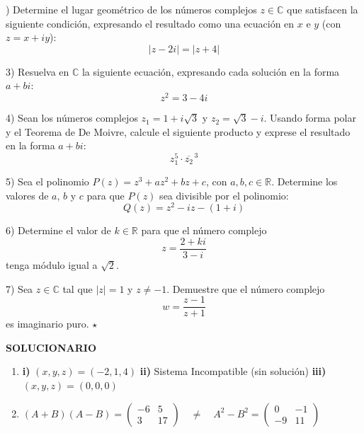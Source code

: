 \documentclass[letterpaper, 12pt]{article}
\newenvironment{solbox}[1]{%
    \begin{tcolorbox}[colback=celesteSuave, colframe=azulFuerte,
        title=\textbf{#1}, fonttitle=\bfseries]
}{%
    \end{tcolorbox}
}
\newenvironment{ejercicios}{}{}
\newenvironment{soluciones}{%
    \newpage
    \begin{center}
        \begin{tcolorbox}[colback=azulFuerte, colframe=azulFuerte,
            colupper=white, width=0.8\textwidth, center, arc=10pt]
            \centering\Large\textbf{SOLUCIONARIO}
        \end{tcolorbox}
    \end{center}
    \footnotesize
}{}
\begin{document}
\begin{ejercicios}
2) Determine el lugar geométrico de los números complejos $z \in \mathbb{C}$ que satisfacen la siguiente condición, expresando el resultado como una ecuación en $x$ e $y$ (con $z = x+iy$):
$$ |z - 2i| = |z + 4| $$
 
\vspace{0.5cm}
 
3) Resuelva en $\mathbb{C}$ la siguiente ecuación, expresando cada solución en la forma $a+bi$:
$$ z^2 = 3 - 4i $$
 
\vspace{0.5cm}
 
4) Sean los números complejos $z_1 = 1 + i\sqrt{3}$ y $z_2 = \sqrt{3} - i$. Usando forma polar y el Teorema de De Moivre, calcule el siguiente producto y exprese el resultado en la forma $a+bi$:
$$ z_1^5 \cdot \overline{z_2}^{\,3} $$
 
\vspace{0.5cm}
 
5) Sea el polinomio $P(z) = z^3 + az^2 + bz + c$, con $a, b, c \in \mathbb{R}$. Determine los valores de $a$, $b$ y $c$ para que $P(z)$ sea divisible por el polinomio:
$$ Q(z) = z^2 - iz - (1+i) $$

\vspace{0.5cm}

6) Determine el valor de $k \in \mathbb{R}$ para que el número complejo
$$ z = \frac{2 + ki}{3 - i} $$
tenga módulo igual a $\sqrt{2}$.

\vspace{0.5cm}

7) Sea $z \in \mathbb{C}$ tal que $|z| = 1$ y $z \neq -1$. Demuestre que el número complejo
$$ w = \frac{z - 1}{z + 1} $$
es imaginario puro. $\star$


\newpage

\begin{soluciones}

\begin{solbox}{I. Respuestas - Matrices y Sistemas de Ecuaciones}
\begin{enumerate}[label=\color{azulFuerte}\bfseries\arabic*), leftmargin=*, itemsep=0.6em]
    \item \textbf{i)} $(x, y, z) = (-2, 1, 4)$ \quad \textbf{ii)} Sistema Incompatible (sin solución) \quad \textbf{iii)} $(x, y, z) = (0, 0, 0)$

    \item $(A+B)(A-B) = \begin{pmatrix} -6 & 5 \\ 3 & 17 \end{pmatrix} \quad \neq \quad A^2 - B^2 = \begin{pmatrix} 0 & -1 \\ -9 & 11 \end{pmatrix}$


\end{enumerate}
\end{solbox}
\end{soluciones}
\end{ejercicios}
\end{document}
